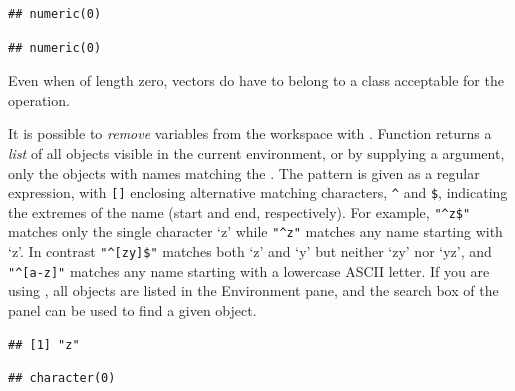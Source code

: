 \documentclass[krantz2]{krantz}\usepackage{knitr}
\begin{document}
\begin{explainbox}
\begin{knitrout}\footnotesize
{}\color{fgcolor}\begin{kframe}
\begin{alltt}
\hlstd{(}\hlstd{(}\hlstd{))}
\end{alltt}
\begin{verbatim}
## numeric(0)
\end{verbatim}
\begin{alltt}
 \hlopt{+} \hlstd{(}\hlstd{)}
\end{alltt}
\begin{verbatim}
## numeric(0)
\end{verbatim}
\end{kframe}
\end{knitrout}

Even when of length zero, vectors do have to belong to a class acceptable for the operation.

\end{explainbox}

It is possible to \emph{remove} variables from the workspace with . Function  returns a \emph{list} of all objects visible in the current environment, or by supplying a  argument, only the objects with names matching the . The pattern is given as a regular expression, with \verb|[]| enclosing alternative matching characters, \verb|^| and \verb|$|, indicating the extremes of the name (start and end, respectively). For example, \verb|"^z$"| matches only the single character `z' while \verb|"^z"| matches any name starting with `z'. In contrast \verb|"^[zy]$"| matches both `z' and `y' but neither `zy' nor `yz', and \verb|"^[a-z]"| matches any name starting with a lowercase ASCII letter. If you are using , all objects are listed in the Environment pane, and the search box of the panel can be used to find a given object.

\begin{knitrout}\footnotesize
{}\color{fgcolor}\begin{kframe}
\begin{alltt}
\hlstd{(}\hlstd{=}\hlstd{)}
\end{alltt}
\begin{verbatim}
## [1] "z"
\end{verbatim}
\begin{alltt}
\hlstd{(}\hlstd{=}\hlstd{)}
\end{alltt}
\begin{verbatim}
## character(0)
\end{verbatim}
\end{kframe}
\end{knitrout}
\end{document}
